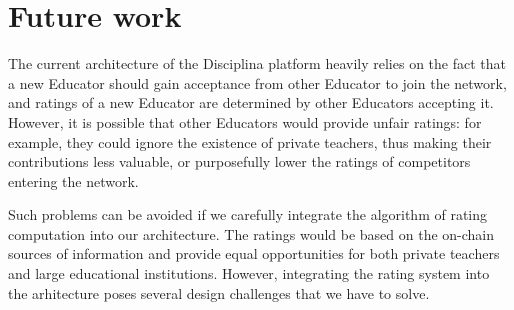 \section{Future work}
The current architecture of the Disciplina platform heavily relies on the
fact that a new Educator should gain acceptance from other Educator to join the
network, and ratings of a new Educator are determined by other Educators
accepting it. However, it is possible that other Educators would provide unfair ratings: for example,
they could ignore the existence of private teachers, thus making their
contributions less valuable, or purposefully lower the ratings of competitors
entering the network.

Such problems can be avoided if we carefully integrate the
algorithm of rating computation into our architecture. The ratings would be
based on the on-chain sources of information and provide equal opportunities for
both private teachers and large educational institutions. However, integrating
the rating system into the arhitecture poses several design challenges that we
have to solve.

